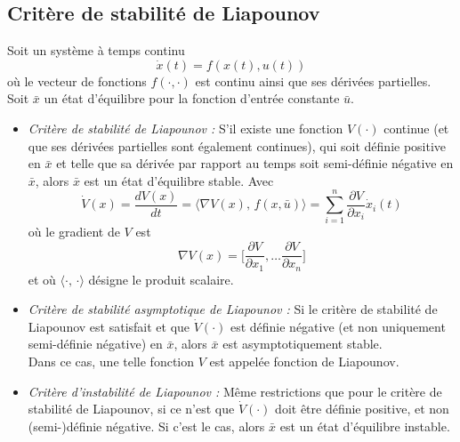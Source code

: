 \documentclass[a4paper]{article}
\begin{document}
\subsection{Critère de stabilité de Liapounov}
Soit un système à temps continu
\[\dot x(t)=f(x(t),u(t))\]
où le vecteur de fonctions $f(\cdot, \cdot)$ est continu ainsi que ses
dérivées partielles.\\
Soit $\bar x$ un état d'équilibre pour la fonction d'entrée constante $\bar u$.
\begin{itemize}
	\item \emph{Critère de stabilité de Liapounov :} S'il existe une fonction
		$V(\cdot)$ continue (et que ses dérivées partielles sont également
		continues), qui soit définie positive en $\bar x$ et telle que sa
		dérivée par rapport au temps soit semi-définie négative en $\bar x$,
		alors $\bar x$ est un état d'équilibre stable.
		Avec
		\[
			\dot V(x)=\frac{dV(x)}{dt}
			=\langle\nabla V(x),\,f(x,\bar u)\rangle
			=\sum_{i=1}^{n}\frac{\partial V}{\partial x_i}\dot x_i(t)\]
		où le gradient de \(V\) est
		\[\nabla V(x)=\big[\frac{\partial V}{\partial x_1},\dots
		\frac{\partial V}{\partial x_n}\big]\]
		et où \(\langle\cdot,\,\cdot\rangle\) désigne le produit scalaire.
	\item \emph{Critère de stabilité asymptotique de Liapounov :}
		Si le critère de stabilité de Liapounov est satisfait et que
		$\dot V(\cdot)$ est définie négative (et non uniquement semi-définie
		négative) en $\bar x$, alors $\bar x$ est asymptotiquement stable.\\
		Dans ce cas, une telle fonction \(V\) est appelée fonction de Liapounov.
	\item \emph{Critère d'instabilité de Liapounov :} Même restrictions
		que pour le critère de stabilité de Liapounov, si ce n'est que
		$\dot V(\cdot)$ doit être définie positive, et non
		(semi-)définie négative. Si c'est le cas, alors \(\bar x\) est
		un état d'équilibre instable.
\end{itemize}
\end{document}
